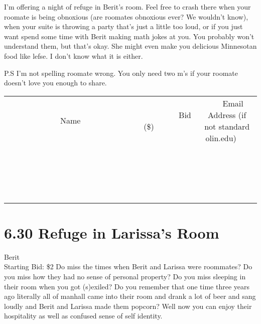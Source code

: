 \documentclass[11pt]{article}
\begin{document}
I'm offering a night of refuge in Berit's room. Feel free to crash there when your roomate is being obnoxious (are roomates obnoxious ever? We wouldn't know), when your suite is throwing a party that's just a little too loud, or if you just want spend some time with Berit making math jokes at you. You probably won't understand them, but that's okay. She might even make you delicious Minnesotan food like lefse. I don't know what it is either. 

P.S I'm not spelling roomate wrong. You only need two m's if your roomate doesn't love you enough to share.
\\[3ex]
\begin{tabular}{c c c}
~~~~~~~~~~~~~Name~~~~~~~~~~~~~ & ~~~~~~~~~Bid (\$)~~~~~~~~~  & ~~~Email Address (if not standard olin.edu)~~~\\
 & & \\
\hline
 & & \\
\hline
 & & \\
\hline
 & & \\
\hline
 & & \\
\hline
 & & \\
\hline
 & & \\
\hline
 & & \\
\hline
 & & \\
\hline
 & & \\
\hline
 & & \\
\hline
 & & \\
\hline
 & & \\
\hline
 & & \\
\hline
 & & \\
\hline
 & & \\
\hline
 & & \\
\hline
 & & \\
\hline
 & & \\
\hline
\end{tabular}
\newpage
\section*{6.30 Refuge in Larissa's Room}
Berit 
\\
Starting Bid: \$2
\newline
Do miss the times when Berit and Larissa were roommates? Do you miss how they had no sense of personal property? Do you miss sleeping in their room when you got (s)exiled? Do you remember that one time three years ago literally all of manhall came into their room and drank a lot of beer and sang loudly and Berit and Larissa made them popcorn? 
Well now you can enjoy their hospitality as well as confused sense of self identity. 
\end{document}
